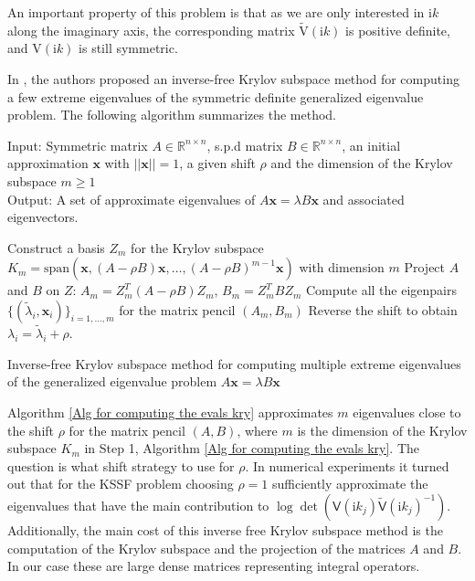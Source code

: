 An important property of this problem is that as we are only interested in $\mathrm{i}k$ along the imaginary axis, the corresponding matrix $\tilde{\mathrm{V}}(\mathrm{i}k)$ is positive definite,
and $\mathrm{V}(\mathrm{i}k)$ is still symmetric.

In \cite{golub2002inverse, money2005algorithm},
the authors proposed an inverse-free Krylov subspace method for computing a few extreme eigenvalues of the symmetric definite generalized eigenvalue problem.
The following algorithm summarizes the method.

\begin{algorithm}[H]
    \SetAlgoLined
    Input: Symmetric matrix $A\in\mathbb{R}^{n\times n}$, s.p.d matrix $B\in\mathbb{R}^{n\times n}$, an initial approximation $\boldsymbol{x}$ with $||\boldsymbol{x}|| = 1$,
    a given shift $\rho$ and the dimension of the Krylov subspace $m\geq 1$\\
    Output: A set of approximate eigenvalues of $A\boldsymbol{x} = \lambda B\boldsymbol{x}$ and associated eigenvectors.\\
    \begin{algorithmic}[1]
        
        \STATE Construct a basis $Z_{m}$ for the Krylov subspace $K_{m} = \text{span}(\boldsymbol{x}, (A - \rho B)\boldsymbol{x}, \dots, (A - \rho B)^{m-1}\boldsymbol{x})$ with dimension $m$
        \STATE Project $A$ and $B$ on $Z$: $A_{m} = Z_{m}^{T}(A - \rho B)Z_{m}$, $B_{m} = Z_{m}^{T}BZ_{m}$
        \STATE Compute all the eigenpairs $\{(\tilde{\lambda}_{i}, \boldsymbol{x}_{i})\}_{i = 1, \dots, m}$ for the matrix pencil $(A_{m}, B_{m})$
        \STATE Reverse the shift to obtain $\lambda_{i} = \tilde{\lambda}_{i} + \rho$.
        \end{algorithmic}
    \caption{Inverse-free Krylov subspace method for computing multiple extreme eigenvalues of the generalized eigenvalue problem $A\boldsymbol{x} = \lambda B\boldsymbol{x}$}
    \label{Alg for computing the evals kry}
    \end{algorithm}
   
    
Algorithm \ref{Alg for computing the evals kry} approximates $m$ eigenvalues close to the shift $\rho$ 
for the matrix pencil $(A,B)$, where $m$ is the dimension of the 
Krylov subspace $K_{m}$ in Step 1, Algorithm \ref{Alg for computing the evals kry}. The question is what shift strategy to use for $\rho$. In numerical experiments it turned
out that for the KSSF problem choosing $\rho=1$ sufficiently approximate the eigenvalues that have the main contribution to $\log\det(\mathsf{V}(\mathrm{i}k_{j})\tilde{\mathsf{V}}(\mathrm{i}k_{j})^{-1}) $.
Additionally, the main cost of this inverse free Krylov subspace method is the computation of the Krylov subspace and the projection of the matrices $A$ and $B$. In our case these are large dense matrices representing
integral operators. 

